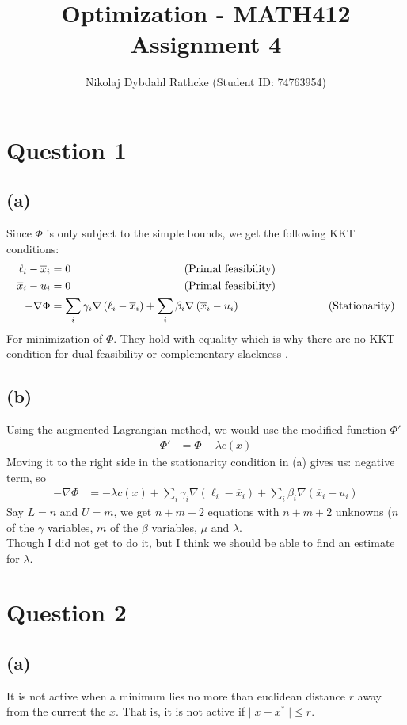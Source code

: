 \documentclass[a4paper, fleqn]{article}
\author{Nikolaj Dybdahl Rathcke (Student ID: 74763954)}
\title{Optimization - MATH412 \\ Assignment 4}
\newcommand{\comment}[1]{%
  \text{\phantom{(#1)}} \tag{#1}}
\def\dpip{|\!|}
\begin{document}
\maketitle

\newpage

\section{Question 1}
\subsection{(a)}
Since $\Phi$ is only subject to the simple bounds, we get the following KKT conditions:
\begin{align*}
  \ell_i-\overline{x}_i&=0 \comment{Primal feasibility} \\
  \overline{x}_i-u_i&=0 \comment {Primal feasibility} \\
  -\nabla \Phi &= \sum_i \gamma_i\nabla\left(\ell_i-\overline{x}_i\right)+\sum_i \beta_i
  \nabla\left(\overline{x}_i-u_i\right) \comment{Stationarity}
\end{align*}
For minimization of $\Phi$. They hold with equality which is why there are no KKT
condition for dual feasibility or complementary slackness
.
\subsection{(b)}
Using the augmented Lagrangian method, we would use the modified function $\Phi'$
\begin{align*}
  \Phi'&= \Phi-\lambda c(x)
\end{align*}
Moving it to the right side in the stationarity condition in (a) gives us:
negative term, so
\begin{align*}
  -\nabla \Phi &= -\lambda c(x) +\sum_i \gamma_i\nabla\left(\ell_i-\overline{x}_i\right)+\sum_i \beta_i
  \nabla\left(\overline{x}_i-u_i\right)
\end{align*}
Say $L=n$ and $U=m$, we get $n+m+2$ equations with $n+m+2$ unknowns ($n$ of the $\gamma$
variables, $m$ of the $\beta$ variables, $\mu$ and $\lambda$.  \\
Though I did not get to do it, but I think we should be able to find an estimate for
$\lambda$.

\section{Question 2}
\subsection{(a)}
It is not active when a minimum lies no more than euclidean distance $r$ away
from the current the $x$. That is, it is not active if $\dpip x-x^* \dpip\leq r$.
\end{document}
